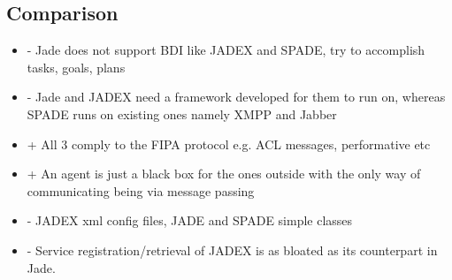 \documentclass[a4paper, 11pt]{article}
\begin{document}
\subsection{Comparison}

\begin{itemize}
	\item - Jade does not support BDI like JADEX and SPADE, try to accomplish tasks, goals, plans
	\item - Jade and JADEX need a framework developed for them to run on, whereas SPADE runs on existing ones namely XMPP and Jabber
	\item + All 3 comply to the FIPA protocol e.g. ACL messages, performative etc
	\item + An agent is just a black box for the ones outside with the only way of communicating being via message passing
	\item - JADEX xml config files, JADE and SPADE simple classes
        \item - Service registration/retrieval of JADEX is as bloated as its counterpart in Jade.
\end{itemize}


\end{document}
